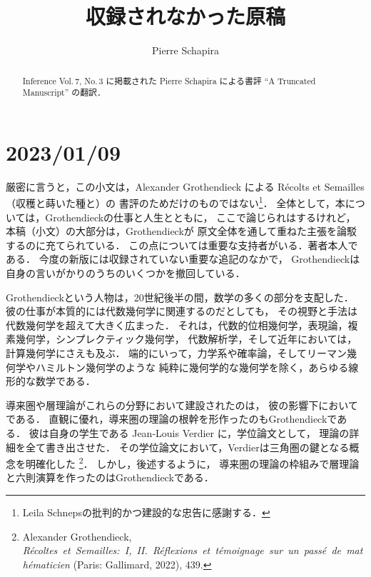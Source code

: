 \documentclass[11pt, a4paper, dvipdfmx]{jlreq}
\theoremstyle{definition}
\theoremstyle{mystyle}
\numberwithin{equation}{section} %
\begin{document}
\title{収録されなかった原稿}
\author{Pierre Schapira}
\date{}
\maketitle
\begin{abstract}
    Inference Vol.\,7, No.\,3
    に掲載された
    Pierre Schapira による書評 ``A Truncated Manuscript'' の翻訳．
\end{abstract}


\section*{2023/01/09}
厳密に言うと，この小文は，Alexander Grothendieck による
R\'ecolts et Semailles（収穫と蒔いた種と）の
書評のためだけのものではない\footnote[1]{
    Leila Schnepsの批判的かつ建設的な忠告に感謝する．
}．
全体として，本については，Grothendieckの仕事と人生とともに，
ここで論じられはするけれど，本稿（小文）の大部分は，Grothendieckが
原文全体を通して重ねた主張を論駁するのに充てられている．
この点については重要な支持者がいる．著者本人である．
今度の新版には収録されていない重要な追記のなかで，
Grothendieckは自身の言いがかりのうちのいくつかを撤回している．

Grothendieckという人物は，20世紀後半の間，数学の多くの部分を支配した．
彼の仕事が本質的には代数幾何学に関連するのだとしても，
その視野と手法は代数幾何学を超えて大きく広まった．
それは，代数的位相幾何学，表現論，複素幾何学，シンプレクティック幾何学，
代数解析学，そして近年においては，計算幾何学にさえも及ぶ．
端的にいって，力学系や確率論，そしてリーマン幾何学やハミルトン幾何学のような
純粋に幾何学的な幾何学を除く，あらゆる線形的な数学である．

導来圏や層理論がこれらの分野において建設されたのは，
彼の影響下においてである．
直観に優れ，導来圏の理論の根幹を形作ったのもGrothendieckである．
彼は自身の学生である Jean-Louis Verdier に，学位論文として，
理論の詳細を全て書き出させた．
その学位論文において，Verdierは三角圏の鍵となる概念を明確化した
\footnote[2]{
    Alexander Grothendieck,
    \textit{R\'ecoltes\ et\ Semailles:\ I,\ II.\ R\'eflexions\ et\ t\'emoignage\ sur\ un\ pass\'e\ de\ math\'ematicien} 
    (Paris: Gallimard, 2022), 439.
}．
しかし，後述するように，
導来圏の理論の枠組みで層理論と六則演算を作ったのはGrothendieckである．
\end{document}
